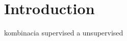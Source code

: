 \chapter*{Introduction}
\* %
\* %

{}



{}

{}
\* %
\* kombinacia supervised a unsupervised

        
        
{}

{}

{}

{}


{}
\* %
